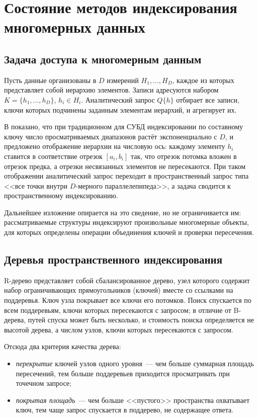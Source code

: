 \chapter{Состояние методов индексирования многомерных данных}
\label{ch:sota}

\section{Задача доступа к многомерным данным}

Пусть данные организованы в $D$ измерений $H_1,\dots,H_D$, каждое из которых
представляет собой иерархию элементов. Записи адресуются набором
$K=\{h_1,\dots,h_D\}$, $h_i\in H_i$. Аналитический запрос $Q\{h\}$ отбирает все
записи, ключи которых подчинены заданным элементам иерархий, и агрегирует их.

В \cite{borodin2011thesis} показано, что при традиционном для СУБД
индексировании по составному ключу число просматриваемых диапазонов растёт
экспоненциально с $D$, и предложено отображение иерархии на числовую ось:
каждому элементу $h_i$ ставится в соответствие отрезок $[a_i,b_i]$ так, что
отрезок потомка вложен в отрезок предка, а отрезки несвязанных элементов не
пересекаются. При таком отображении аналитический запрос переходит в
пространственный запрос типа <<все точки внутри $D$-мерного параллелепипеда>>, а
задача сводится к пространственному индексированию.

Дальнейшее изложение опирается на это сведение, но не ограничивается им:
рассматриваемые структуры индексируют произвольные многомерные объекты, для
которых определены операции объединения ключей и проверки пересечения.

\section{Деревья пространственного индексирования}

R-дерево \cite{guttman1984r} представляет собой сбалансированное дерево, узел
которого содержит набор ограничивающих прямоугольников (ключей) вместе со
ссылками на поддеревья. Ключ узла покрывает все ключи его потомков. Поиск
спускается по всем поддеревьям, ключи которых пересекаются с запросом; в отличие
от B-дерева, путей спуска может быть несколько, и стоимость поиска определяется
не высотой дерева, а числом узлов, ключи которых пересекаются с запросом.

Отсюда два критерия качества дерева:

\begin{itemize}
\item \emph{перекрытие} ключей узлов одного уровня~--- чем больше суммарная
      площадь пересечений, тем больше поддеревьев приходится просматривать при
      точечном запросе;
\item \emph{покрытая площадь}~--- чем больше <<пустого>> пространства охватывает
      ключ, тем чаще запрос спускается в поддерево, не содержащее ответа.
\end{itemize}

